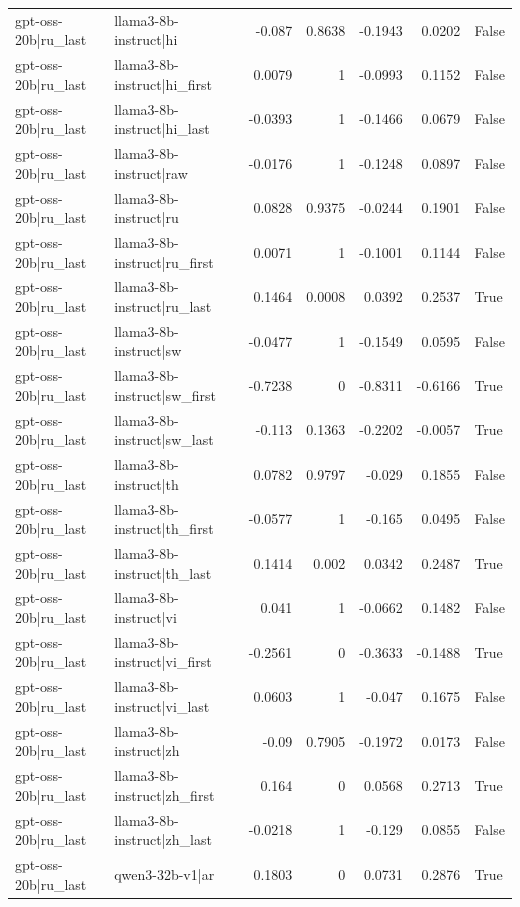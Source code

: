 \begin{table}
\begin{tabular}{l l r r r r l}
gpt-oss-20b|ru_last & llama3-8b-instruct|hi & -0.087 & 0.8638 & -0.1943 & 0.0202 & False \\
gpt-oss-20b|ru_last & llama3-8b-instruct|hi_first & 0.0079 & 1 & -0.0993 & 0.1152 & False \\
gpt-oss-20b|ru_last & llama3-8b-instruct|hi_last & -0.0393 & 1 & -0.1466 & 0.0679 & False \\
gpt-oss-20b|ru_last & llama3-8b-instruct|raw & -0.0176 & 1 & -0.1248 & 0.0897 & False \\
gpt-oss-20b|ru_last & llama3-8b-instruct|ru & 0.0828 & 0.9375 & -0.0244 & 0.1901 & False \\
gpt-oss-20b|ru_last & llama3-8b-instruct|ru_first & 0.0071 & 1 & -0.1001 & 0.1144 & False \\
gpt-oss-20b|ru_last & llama3-8b-instruct|ru_last & 0.1464 & 0.0008 & 0.0392 & 0.2537 & True \\
gpt-oss-20b|ru_last & llama3-8b-instruct|sw & -0.0477 & 1 & -0.1549 & 0.0595 & False \\
gpt-oss-20b|ru_last & llama3-8b-instruct|sw_first & -0.7238 & 0 & -0.8311 & -0.6166 & True \\
gpt-oss-20b|ru_last & llama3-8b-instruct|sw_last & -0.113 & 0.1363 & -0.2202 & -0.0057 & True \\
gpt-oss-20b|ru_last & llama3-8b-instruct|th & 0.0782 & 0.9797 & -0.029 & 0.1855 & False \\
gpt-oss-20b|ru_last & llama3-8b-instruct|th_first & -0.0577 & 1 & -0.165 & 0.0495 & False \\
gpt-oss-20b|ru_last & llama3-8b-instruct|th_last & 0.1414 & 0.002 & 0.0342 & 0.2487 & True \\
gpt-oss-20b|ru_last & llama3-8b-instruct|vi & 0.041 & 1 & -0.0662 & 0.1482 & False \\
gpt-oss-20b|ru_last & llama3-8b-instruct|vi_first & -0.2561 & 0 & -0.3633 & -0.1488 & True \\
gpt-oss-20b|ru_last & llama3-8b-instruct|vi_last & 0.0603 & 1 & -0.047 & 0.1675 & False \\
gpt-oss-20b|ru_last & llama3-8b-instruct|zh & -0.09 & 0.7905 & -0.1972 & 0.0173 & False \\
gpt-oss-20b|ru_last & llama3-8b-instruct|zh_first & 0.164 & 0 & 0.0568 & 0.2713 & True \\
gpt-oss-20b|ru_last & llama3-8b-instruct|zh_last & -0.0218 & 1 & -0.129 & 0.0855 & False \\
gpt-oss-20b|ru_last & qwen3-32b-v1|ar & 0.1803 & 0 & 0.0731 & 0.2876 & True \\

\end{tabular}
\end{table}

